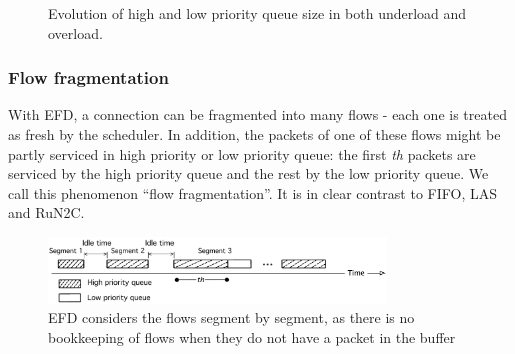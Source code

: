 \documentclass[preprint,12pt]{elsarticle}
\begin{document}
\begin{figure}[ht]
  \centering
  \caption{Evolution of high and low priority queue size  in both underload and overload.}
  \label{fig:queue_evo}
\end{figure}


\subsubsection{Flow fragmentation} \label{sec:fragmentation}

With EFD, a connection can be fragmented into many flows - each one is treated as fresh by the scheduler. In addition, the packets of one of these flows might be partly serviced in high priority or low priority queue: the first \textit{th} packets are serviced by the high priority queue and the rest by the low priority queue. We call this phenomenon ``flow fragmentation''. It is in clear contrast to FIFO, LAS and RuN2C.

\begin{figure}[ht]%
   \centering
  \includegraphics[width=0.8\textwidth]{./fig/flow-split}%
   \caption{EFD considers the flows segment by segment, as there is no bookkeeping of flows when they do not have a packet in the buffer}
   \label{fig:flow-split}
\end{figure}
\end{document}
